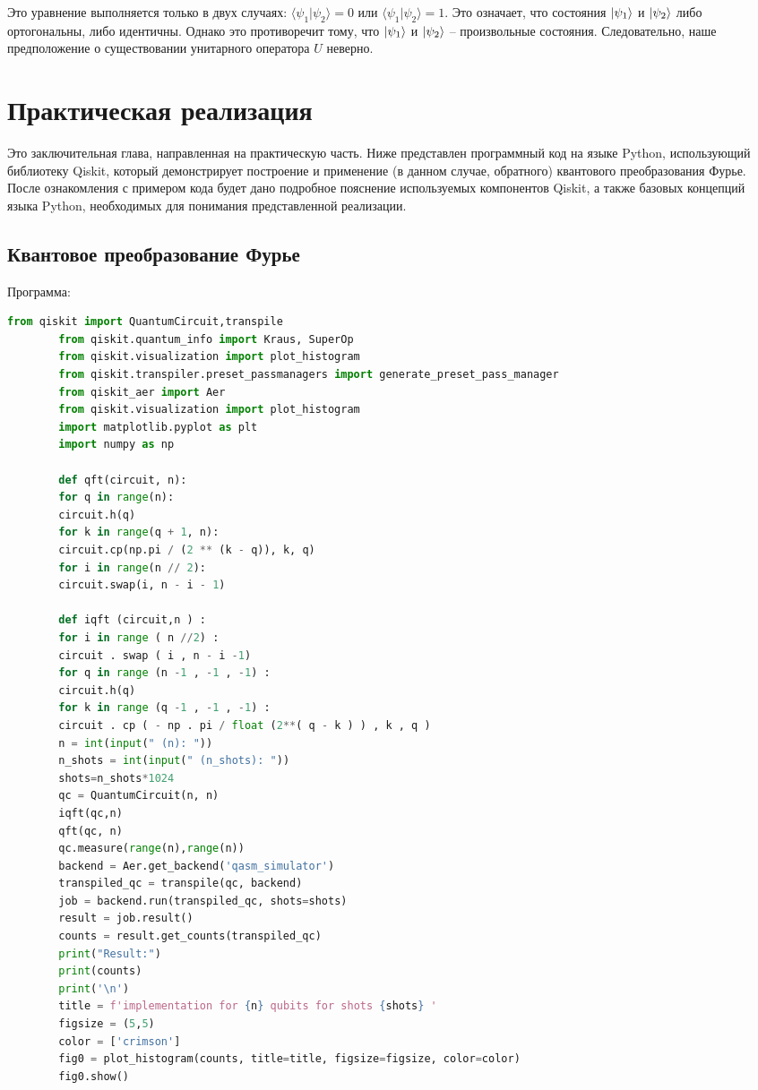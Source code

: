 \documentclass[12pt,a4paper]{article}
\begin{document}
	Это уравнение выполняется только в двух случаях: $\langle \psi_1 | \psi_2 \rangle = 0$ или $\langle \psi_1 | \psi_2 \rangle = 1$. Это означает, что состояния $\ket{\psi_1}$ и $\ket{\psi_2}$ либо ортогональны, либо идентичны. Однако это противоречит тому, что $\ket{\psi_1}$ и $\ket{\psi_2}$ -- произвольные состояния. Следовательно, наше предположение о существовании унитарного оператора $U$ неверно.
	
	
	\section{Практическая реализация}
	Это заключительная глава, направленная на практическую часть. Ниже представлен программный код на языке Python, использующий библиотеку Qiskit, который демонстрирует построение и применение (в данном случае, обратного) квантового преобразования Фурье. После ознакомления с примером кода будет дано подробное пояснение используемых компонентов Qiskit, а также базовых концепций языка Python, необходимых для понимания представленной реализации.
	
	\subsection{Квантовое преобразование Фурье}
	Программа:
	\begin{lstlisting}[language=Python]
		from qiskit import QuantumCircuit,transpile
		from qiskit.quantum_info import Kraus, SuperOp
		from qiskit.visualization import plot_histogram
		from qiskit.transpiler.preset_passmanagers import generate_preset_pass_manager
		from qiskit_aer import Aer
		from qiskit.visualization import plot_histogram
		import matplotlib.pyplot as plt
		import numpy as np
		
		def qft(circuit, n):
		for q in range(n):
		circuit.h(q)
		for k in range(q + 1, n): 
		circuit.cp(np.pi / (2 ** (k - q)), k, q) 
		for i in range(n // 2):
		circuit.swap(i, n - i - 1)
		
		def iqft (circuit,n ) :
		for i in range ( n //2) :
		circuit . swap ( i , n - i -1)
		for q in range (n -1 , -1 , -1) :
		circuit.h(q)
		for k in range (q -1 , -1 , -1) :
		circuit . cp ( - np . pi / float (2**( q - k ) ) , k , q )
		n = int(input(" (n): "))
		n_shots = int(input(" (n_shots): ")) 
		shots=n_shots*1024 
		qc = QuantumCircuit(n, n)
		iqft(qc,n)
		qft(qc, n) 
		qc.measure(range(n),range(n))
		backend = Aer.get_backend('qasm_simulator')
		transpiled_qc = transpile(qc, backend)
		job = backend.run(transpiled_qc, shots=shots)
		result = job.result()
		counts = result.get_counts(transpiled_qc)
		print("Result:")
		print(counts)
		print('\n')
		title = f'implementation for {n} qubits for shots {shots} '
		figsize = (5,5) 
		color = ['crimson'] 
		fig0 = plot_histogram(counts, title=title, figsize=figsize, color=color) 
		fig0.show()
	\end{lstlisting}
\end{document}
